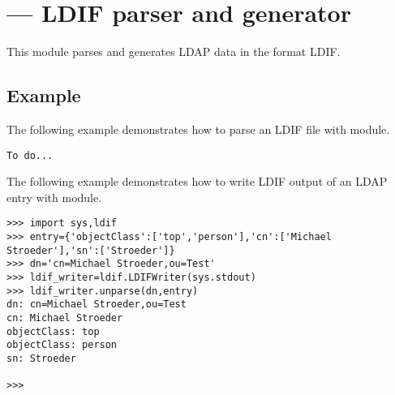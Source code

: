 

\section{ ---
         LDIF parser and generator}






This module parses and generates LDAP data in the format LDIF.

\begin{seealso}
\end{seealso}

\subsection{Example \label{ldif-example}}

The following example demonstrates how to parse an LDIF file
with  module.

\begin{verbatim}
To do...
\end{verbatim}

The following example demonstrates how to write LDIF output
of an LDAP entry with  module.

\begin{verbatim}
>>> import sys,ldif
>>> entry={'objectClass':['top','person'],'cn':['Michael Stroeder'],'sn':['Stroeder']}
>>> dn='cn=Michael Stroeder,ou=Test'
>>> ldif_writer=ldif.LDIFWriter(sys.stdout)
>>> ldif_writer.unparse(dn,entry)
dn: cn=Michael Stroeder,ou=Test
cn: Michael Stroeder
objectClass: top
objectClass: person
sn: Stroeder

>>> 
\end{verbatim}
